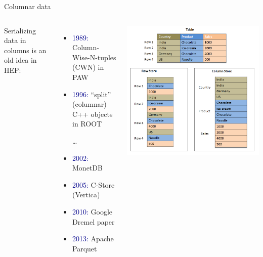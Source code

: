 \documentclass[aspectratio=169]{beamer}
\begin{document}
\begin{frame}{Columnar data}
\vspace{0.25 cm}
\begin{columns}
Serializing data in columns is an old idea in HEP:

\vspace{0.25 cm}
\begin{itemize}
\item \textcolor{darkblue}{1989:} Column-Wise-N-tuples (CWN) in PAW
\item \textcolor{darkblue}{1996:} ``split'' (columnar) C++ objects in ROOT

\vspace{0.25 cm}
\ldots

\vspace{0.25 cm}
\item \textcolor{darkblue}{2002:} MonetDB
\item \textcolor{darkblue}{2005:} C-Store (Vertica)
\item \textcolor{darkblue}{2010:} Google Dremel paper
\item \textcolor{darkblue}{2013:} Apache Parquet
\end{itemize}

\includegraphics[width=\linewidth]{columnar-vs-rowwise-sap.png}
\end{columns}
\end{frame}
\end{document}
